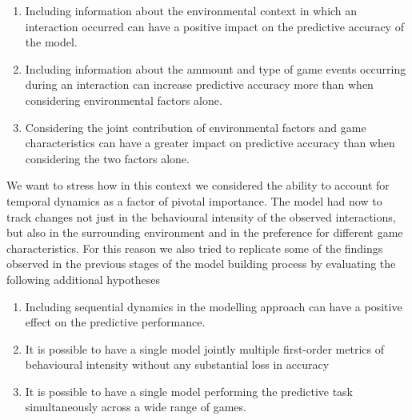 \begin{enumerate}
    \item Including information about the environmental context in which an interaction occurred can have a positive impact on the predictive accuracy of the model.
    \item Including information about the ammount and type of game events occurring during an interaction can increase predictive accuracy more than when considering environmental factors alone. 
    \item Considering the joint contribution of environmental factors and game characteristics can have a greater impact on predictive accuracy than when considering the two factors alone.  
\end{enumerate}
We want to stress how in this context we considered the ability to account for temporal dynamics as a factor of pivotal importance. The model had now to track changes not just in the behavioural intensity of the observed interactions, but also in the surrounding environment and in the preference for different game characteristics. For this reason we also tried to replicate some of the findings observed in the previous stages of the model building process by evaluating the following additional hypotheses
\begin{enumerate}
    \item Including sequential dynamics in the modelling approach can have a positive effect on the predictive performance.
    \item It is possible to have a single model jointly multiple first-order metrics of behavioural intensity without any substantial loss in accuracy
    \item It is possible to have a single model performing the predictive task simultaneously across a wide range of games.
\end{enumerate}

